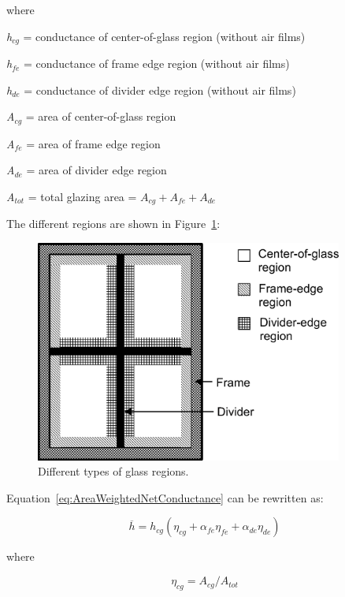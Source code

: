where

\emph{h\(_{cg}\)} = conductance of center-of-glass region (without air films)

\emph{h\(_{fe}\)} = conductance of frame edge region (without air films)

\emph{h\(_{de}\)} = conductance of divider edge region (without air films)

\emph{A\(_{cg}\)} = area of center-of-glass region

\emph{A\(_{fe}\)} = area of frame edge region

\emph{A\(_{de}\)} = area of divider edge region

\emph{A\(_{tot}\)} = total glazing area = \({A_{cg}} + {A_{fe}} + {A_{de}}\)

The different regions are shown in Figure~\ref{fig:different-types-of-glass-regions.}:

\begin{figure}[hbtp] %
\centering
\includegraphics[width=0.9\textwidth, height=0.9\textheight, keepaspectratio=true]{media/image1534.png}
\caption{Different types of glass regions. \label{fig:different-types-of-glass-regions.}}
\end{figure}

Equation~\ref{eq:AreaWeightedNetConductance} can be rewritten as:

\begin{equation}
\overline h  = {h_{cg}}\left( {{\eta_{cg}} + {\alpha_{fe}}{\eta_{fe}} + {\alpha_{de}}{\eta_{de}}} \right)
\label{eq:HbarConductanceEquation}
\end{equation}

where

\begin{equation}
{\eta_{cg}} = {A_{cg}}/{A_{tot}}
\end{equation}

